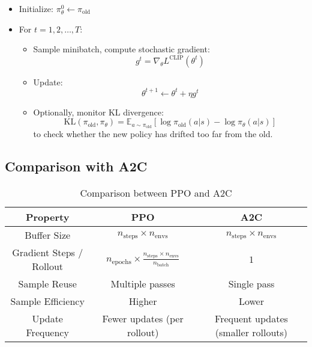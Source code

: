 \documentclass{article}
\begin{document}
\begin{itemize}
    \item Initialize: $\pi_\theta^0 \gets \pi_{\text{old}}$
    \item For $t = 1, 2, \ldots, T$:
    \begin{itemize}
        \item Sample minibatch, compute stochastic gradient:
        \begin{equation}
            g^t = \nabla_\theta L^{\text{CLIP}}(\theta^t)
        \end{equation}
        \item Update:
        \begin{equation}
            \theta^{t+1} \gets \theta^t + \eta g^t
        \end{equation}
        \item Optionally, monitor KL divergence:
        \begin{equation}
            \text{KL}(\pi_{\text{old}}, \pi_\theta) = \mathbb{E}_{a \sim \pi_{\text{old}}} \left[ \log \pi_{\text{old}}(a|s) - \log \pi_\theta(a|s) \right]
        \end{equation}
        to check whether the new policy has drifted too far from the old.
    \end{itemize}
\end{itemize}

\subsection{Comparison with A2C}

\begin{table}[H]
\centering
\begin{tabular}{|c|c|c|}
\hline
\textbf{Property} & \textbf{PPO} & \textbf{A2C} \\
\hline
Buffer Size & $n_{\text{steps}} \times n_{\text{envs}}$ & $n_{\text{steps}} \times n_{\text{envs}}$ \\
\hline
Gradient Steps / Rollout & $n_{\text{epochs}} \times \frac{n_{\text{steps}} \times n_{\text{envs}}}{n_{\text{batch}}}$ & $1$ \\
\hline
Sample Reuse & Multiple passes & Single pass \\
\hline
Sample Efficiency & Higher & Lower \\
\hline
Update Frequency & Fewer updates (per rollout) & Frequent updates (smaller rollouts) \\
\hline
\end{tabular}
\caption{Comparison between PPO and A2C}
\end{table}
\end{document}
